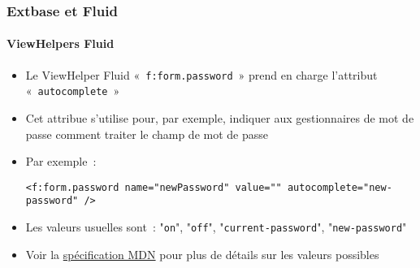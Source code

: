%

\begin{frame}[fragile]
	\frametitle{Extbase et Fluid}
	\framesubtitle{ViewHelpers Fluid}


	\begin{itemize}
		\item Le ViewHelper Fluid «~\texttt{f:form.password}~» prend en charge
			l'attribut «~\texttt{autocomplete}~»
		\item Cet attribue s'utilise pour, par exemple, indiquer aux gestionnaires
		    de mot de passe comment traiter le champ de mot de passe
		\item Par exemple~:
\begin{lstlisting}
<f:form.password name="newPassword" value="" autocomplete="new-password" />
\end{lstlisting}

		\item Les valeurs usuelles sont~:\newline
			\small"\texttt{on}", "\texttt{off}", "\texttt{current-password}", "\texttt{new-password}"\normalsize
		\item Voir la
			\href{https://developer.mozilla.org/fr/docs/Web/HTML/Element/input/password#param%C3%A9trer_l%E2%80%99autocompl%C3%A9tion}{spécification MDN}
			pour plus de détails sur les valeurs possibles

	\end{itemize}

\end{frame}

